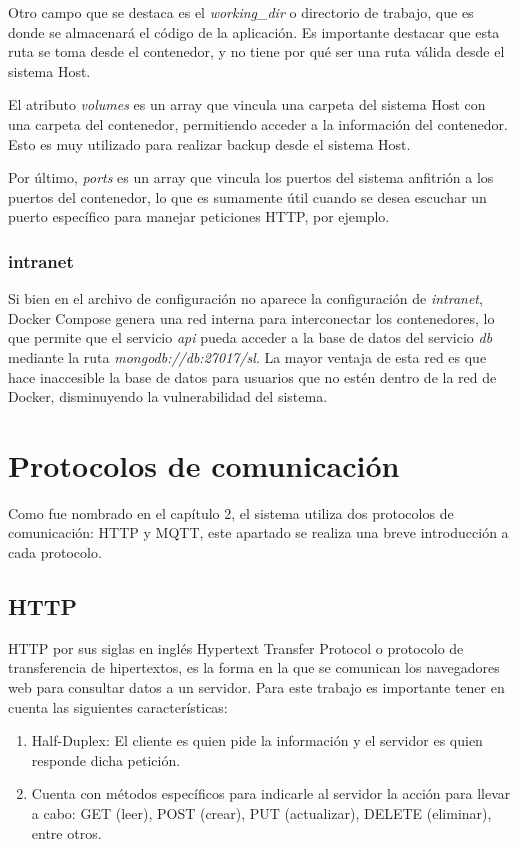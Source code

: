 Otro campo que se destaca es el \textit{working\_dir} o directorio de trabajo, que es donde se almacenará el código de la aplicación. Es importante destacar que esta ruta se toma desde el contenedor, y no tiene por qué ser una ruta válida desde el sistema Host.

El atributo \textit{volumes} es un array que vincula una carpeta del sistema Host con una carpeta del contenedor, permitiendo acceder a la información del contenedor.
Esto es muy utilizado para realizar backup desde el sistema Host.

Por último, \textit{ports} es un array que vincula los puertos del sistema anfitrión a los puertos del contenedor, lo que es sumamente útil cuando se desea escuchar un puerto específico para manejar peticiones HTTP, por ejemplo.

\subsubsection{intranet}

Si bien en el archivo de configuración no aparece la configuración de \textit{intranet}, Docker Compose genera una red interna para interconectar los contenedores, lo que permite que el servicio \textit{api} pueda acceder a la base de datos del servicio \textit{db} mediante la ruta \textit{mongodb://db:27017/sl}. La mayor ventaja de esta red es que hace inaccesible la base de datos para usuarios que no estén dentro de la red de Docker, disminuyendo la vulnerabilidad del sistema.

\section{Protocolos de comunicación}

Como fue nombrado en el capítulo 2, el sistema utiliza dos protocolos de comunicación: HTTP y MQTT, este apartado se realiza una breve introducción a cada protocolo.

\subsection{HTTP}

HTTP por sus siglas en inglés Hypertext Transfer Protocol o protocolo de transferencia de hipertextos, es la forma en la que se comunican los navegadores web para consultar datos a un servidor.
Para este trabajo es importante tener en cuenta las siguientes características:

\begin{enumerate}
    \item Half-Duplex: El cliente es quien pide la información y el servidor es quien responde dicha petición.
    \item Cuenta con métodos específicos para indicarle al servidor la acción para llevar a cabo: GET (leer), POST (crear), PUT (actualizar), DELETE (eliminar), entre otros.
\end{enumerate}

